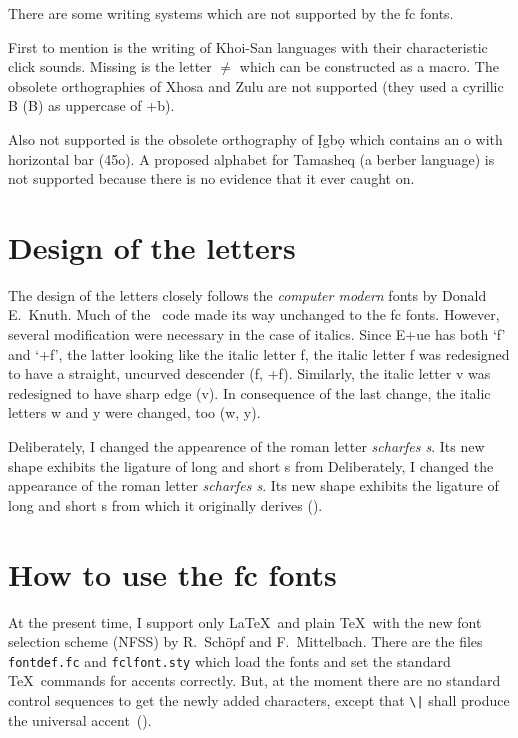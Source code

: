 {There are some writing systems which are not supported by the fc fonts. 

%
First to mention is the writing of Khoi-San languages with their
characteristic click sounds. Missing is the letter $\neq$ which can be 
constructed as a macro. The obsolete orthographies of Xhosa and Zulu are not 
supported (they used a cyrillic B ({\cyr B}) as uppercase of {\fc +b}). 

Also not supported is the obsolete orthography of \d{I}gb\d{o} which 
contains an o with horizontal bar (\accent45o). A proposed alphabet for 
Tamasheq (a berber language) is not supported because there is no evidence 
that it ever caught on.

\section*{Design of the letters}
The design of the letters closely follows the {\em computer modern} fonts 
by Donald E.~Knuth. Much of the \MF\ code made its way unchanged to the fc
fonts. However, several modification were necessary in the case of italics.
Since {\fc E+ue} has both `f' and {\fc`+f'}, the latter looking like the 
italic letter f, the italic letter f was redesigned to have a straight, 
uncurved descender
({\fci f, +f\/}).
Similarly, the italic letter v was redesigned to have 
sharp edge
({\fci v\/}). 
In consequence of the last change, the italic letters w and y 
were changed, too
({\fci w, y\/}).

Deliberately, I changed the appearence of the roman letter {\em 
scharfes s}. Its new shape exhibits the ligature of long and short s from 
%
Deliberately, I changed the appearance of the roman letter {\em 
scharfes s}. Its new shape exhibits the ligature of long and short s from 
which it originally derives
().

\section*{How to use the fc fonts}
At the present time, I support only \LaTeX\ and plain \TeX\ with the new 
font selection scheme (NFSS) by R.~Sch\"opf and F.~Mittelbach. There are 
the files {\tt fontdef.fc} and {\tt fclfont.sty} which load the fonts and 
set the standard \TeX\ commands for accents correctly. But, at the moment 
there are no standard control sequences to get the newly added characters,
except that {\verb:\|:} shall produce the universal 
accent~().

}
